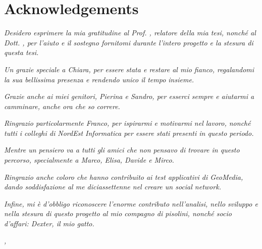 \cleardoublepage
{}
\label{cap:Acknowledgements}

\bigskip

\begingroup
\let\clearpage\relax
\let\cleardoublepage\relax
\let\cleardoublepage\relax

\chapter*{Acknowledgements}

\noindent \textit{Desidero esprimere la mia gratitudine al Prof. \myProf, relatore della mia tesi, nonché al Dott. \myCoSupervisor, per l'aiuto e il sostegno fornitomi durante l'intero progetto e la stesura di questa tesi.}
\vspace{0.8em}

\noindent \textit{Un grazie speciale a Chiara, per essere stata e restare al mio fianco, regalandomi la sua bellissima presenza e rendendo unico il tempo insieme.}
\vspace{0.8em}

\noindent \textit{Grazie anche ai miei genitori, Pierina e Sandro, per esserci sempre e aiutarmi a camminare, anche ora che so correre.}
\vspace{0.8em}

\noindent \textit{Ringrazio particolarmente Franco, per ispirarmi e motivarmi nel lavoro, nonché tutti i colleghi di NordEst Informatica per essere stati presenti in questo periodo.}
\vspace{0.8em}

\noindent \textit{Mentre un pensiero va a tutti gli amici che non pensavo di trovare in questo percorso, specialmente a Marco, Elisa, Davide e Mirco.}
\vspace{0.8em}

\noindent \textit{Ringrazio anche coloro che hanno contribuito ai test applicativi di GeoMedia, dando soddisfazione al me diciassettenne nel creare un social network.}
\vspace{0.8em}

\noindent \textit{Infine, mi è d'obbligo riconoscere l'enorme contributo nell'analisi, nello sviluppo e nella stesura di questo progetto al mio compagno di pisolini, nonché socio d'affari: Dexter, il mio gatto.}

\bigskip

\noindent\textit{\myLocation, \myTime}
\hfill \myName

\endgroup
